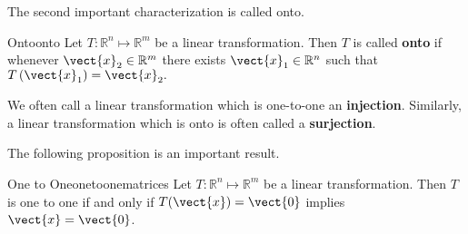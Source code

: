 The second important characterization is called onto.

\begin{definition}{Onto}{onto}
Let $T: \mathbb{R}^n \mapsto \mathbb{R}^m$ be a linear transformation. Then $T$ is called \textbf{onto}
 if whenever $\vect{x}_2 \in \mathbb{R}^{m}$ there exists 
$\vect{x}_1 \in \mathbb{R}^{n}$ such that $T\left( \vect{x}_1\right) = \vect{x}_2. $
\end{definition}

We often call a linear transformation which is one-to-one an \textbf{injection}. Similarly, a linear transformation which is onto is often called a \textbf{surjection}. 

The following proposition is an important result. 

\begin{proposition}{One to One}{onetoonematrices}
Let $T:\mathbb{R}^n \mapsto \mathbb{R}^m$ be a linear transformation. Then $T$ is one to one if
and only if $T(\vect{x}) = \vect{0}$ implies $\vect{x}=\vect{0}$.
\end{proposition}

